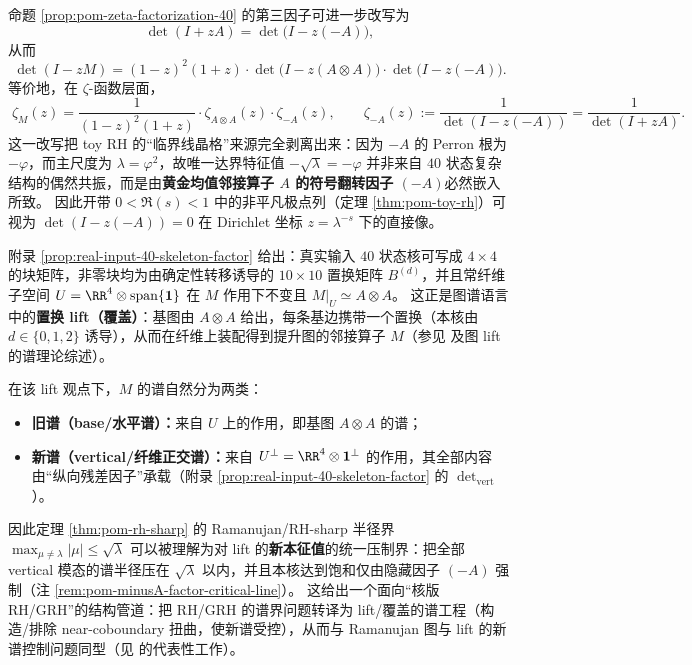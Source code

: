 \begin{remark}\label{rem:pom-minusA-factor-critical-line}
命题 \ref{prop:pom-zeta-factorization-40} 的第三因子可进一步改写为
$$
\det(I+zA)=\det\!\bigl(I-z(-A)\bigr),
$$
从而
$$
\boxed{\;
\det(I-zM)
=(1-z)^2(1+z)\cdot \det\!\bigl(I-z(A\otimes A)\bigr)\cdot \det\!\bigl(I-z(-A)\bigr).
\;}
$$
等价地，在 \(\zeta\)-函数层面，
$$
\boxed{\;
\zeta_M(z)
=\frac{1}{(1-z)^2(1+z)}\cdot \zeta_{A\otimes A}(z)\cdot \zeta_{-A}(z),
\qquad
\zeta_{-A}(z):=\frac{1}{\det(I-z(-A))}=\frac{1}{\det(I+zA)}.
\;}
$$
这一改写把 toy RH 的“临界线晶格”来源完全剥离出来：因为 \(-A\) 的 Perron 根为 \(-\varphi\)，而主尺度为 \(\lambda=\varphi^2\)，故唯一达界特征值
\(
-\sqrt{\lambda}=-\varphi
\)
并非来自 \(40\) 状态复杂结构的偶然共振，而是由\textbf{黄金均值邻接算子 \(A\) 的符号翻转因子 \((-A)\)}必然嵌入所致。
因此开带 \(0<\Re(s)<1\) 中的非平凡极点列（定理 \ref{thm:pom-toy-rh}）可视为 \(\det(I-z(-A))=0\) 在 Dirichlet 坐标 \(z=\lambda^{-s}\) 下的直接像。
\end{remark}

\begin{remark}\label{rem:pom-permutation-lift-ramanujan}
附录 \ref{prop:real-input-40-skeleton-factor} 给出：真实输入 \(40\) 状态核可写成 \(4\times 4\) 的块矩阵，非零块均为由确定性转移诱导的 \(10\times 10\) 置换矩阵 \(B^{(d)}\)，并且常纤维子空间
\(
U=\RR^{4}\otimes \mathrm{span}\{\mathbf{1}\}
\)
在 \(M\) 作用下不变且 \(M|_{U}\simeq A\otimes A\)。
这正是图谱语言中的\textbf{置换 lift（覆盖）}：基图由 \(A\otimes A\) 给出，每条基边携带一个置换（本核由 \(d\in\{0,1,2\}\) 诱导），从而在纤维上装配得到提升图的邻接算子 \(M\)（参见 \cite{StarkTerras1996GraphCoverings,TerrasZetaGraphs} 及图 lift 的谱理论综述）。
\par
在该 lift 观点下，\(M\) 的谱自然分为两类：
\begin{itemize}
  \item \textbf{旧谱（base/水平谱）：}来自 \(U\) 上的作用，即基图 \(A\otimes A\) 的谱；
  \item \textbf{新谱（vertical/纤维正交谱）：}来自 \(U^\perp=\RR^{4}\otimes \mathbf{1}^\perp\) 的作用，其全部内容由“纵向残差因子”承载（附录 \ref{prop:real-input-40-skeleton-factor} 的 \(\det_{\mathrm{vert}}\)）。
\end{itemize}
因此定理 \ref{thm:pom-rh-sharp} 的 Ramanujan/RH-sharp 半径界
\(
\max_{\mu\neq\lambda}|\mu|\le \sqrt{\lambda}
\)
可以被理解为对 lift 的\textbf{新本征值}的统一压制界：把全部 vertical 模态的谱半径压在 \(\sqrt{\lambda}\) 以内，并且本核达到饱和仅由隐藏因子 \((-A)\) 强制（注 \ref{rem:pom-minusA-factor-critical-line}）。
这给出一个面向“核版 RH/GRH”的结构管道：把 RH/GRH 的谱界问题转译为 lift/覆盖的谱工程（构造/排除 near-coboundary 扭曲，使新谱受控），从而与 Ramanujan 图与 lift 的新谱控制问题同型（见 \cite{BiluLinial2006LiftsDiscrepancy,Friedman2008AlonSecondEigenvalue,LinialPuder2010WordMapsLifts} 的代表性工作）。
\end{remark}

